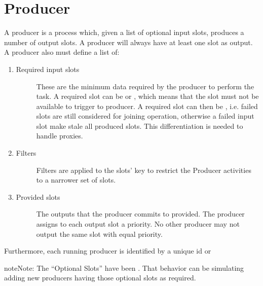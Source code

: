 \documentclass[letterpaper,10pt,english]{sphinxmanual}
\begin{document}
\section{Producer}
\label{\detokenize{slot_prod:producer}}
A producer is a process which, given a list of optional input slots, produces a
number of output slots. A producer will always have at least one slot as output.
A producer also must define a list of:
\begin{enumerate}
\item {} \begin{description}
\item[{Required input slots}] \leavevmode
These are the minimum data required by the producer to perform the task.
A required slot can be  or , which means that the
slot must not be available to trigger to producer. A required slot can then
be , i.e. failed slots are still considered for joining
operation, otherwise a failed input slot make stale all produced slots.
This differentiation is needed to handle proxies.

\end{description}

\item {} \begin{description}
\item[{Filters}] \leavevmode
Filters are applied to the slots’ key to restrict the Producer activities
to a narrower set of slots.

\end{description}

\item {} \begin{description}
\item[{Provided slots}] \leavevmode
The outputs that the producer commits to provided. The producer assigns to
each output slot a priority. No other producer may not output the same slot
with equal priority.

\end{description}

\end{enumerate}

Furthermore, each running producer is identified by a unique id or 

\begin{sphinxadmonition}{note}{Note:}
The “Optional Slots” have been . That behavior can be
simulating adding new producers having those optional slots as required.
\end{sphinxadmonition}
\end{document}
